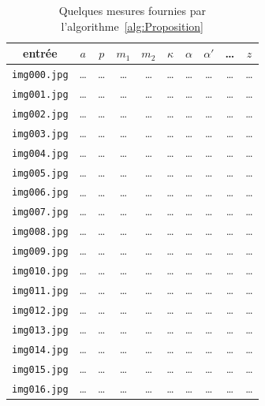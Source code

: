 \documentclass[11pt, french, screen, research-development]{report-rd-info}
\begin{document}
\begin{table}
   \centering
   \begin{tabular}{|c||c|c|c|c|c|c|c|c|c|}
      \hline
      entrée & $a$ & $p$ & $m_1$ & $m_2$ & $\kappa$ & $\alpha$ & $\alpha'$ & \ldots & $z$ \\
      \hline
      \hline
      \texttt{img000.jpg} & \ldots & \ldots & \ldots & \ldots & \ldots & \ldots & \ldots & \ldots & \ldots\\
      \texttt{img001.jpg} & \ldots & \ldots & \ldots & \ldots & \ldots & \ldots & \ldots & \ldots & \ldots\\
      \texttt{img002.jpg} & \ldots & \ldots & \ldots & \ldots & \ldots & \ldots & \ldots & \ldots & \ldots\\
      \texttt{img003.jpg} & \ldots & \ldots & \ldots & \ldots & \ldots & \ldots & \ldots & \ldots & \ldots\\
      \texttt{img004.jpg} & \ldots & \ldots & \ldots & \ldots & \ldots & \ldots & \ldots & \ldots & \ldots\\
      \texttt{img005.jpg} & \ldots & \ldots & \ldots & \ldots & \ldots & \ldots & \ldots & \ldots & \ldots\\
      \texttt{img006.jpg} & \ldots & \ldots & \ldots & \ldots & \ldots & \ldots & \ldots & \ldots & \ldots\\
      \texttt{img007.jpg} & \ldots & \ldots & \ldots & \ldots & \ldots & \ldots & \ldots & \ldots & \ldots\\
      \texttt{img008.jpg} & \ldots & \ldots & \ldots & \ldots & \ldots & \ldots & \ldots & \ldots & \ldots\\
      \texttt{img009.jpg} & \ldots & \ldots & \ldots & \ldots & \ldots & \ldots & \ldots & \ldots & \ldots\\
      \texttt{img010.jpg} & \ldots & \ldots & \ldots & \ldots & \ldots & \ldots & \ldots & \ldots & \ldots\\
      \texttt{img011.jpg} & \ldots & \ldots & \ldots & \ldots & \ldots & \ldots & \ldots & \ldots & \ldots\\
      \texttt{img012.jpg} & \ldots & \ldots & \ldots & \ldots & \ldots & \ldots & \ldots & \ldots & \ldots\\
      \texttt{img013.jpg} & \ldots & \ldots & \ldots & \ldots & \ldots & \ldots & \ldots & \ldots & \ldots\\
      \texttt{img014.jpg} & \ldots & \ldots & \ldots & \ldots & \ldots & \ldots & \ldots & \ldots & \ldots\\
      \texttt{img015.jpg} & \ldots & \ldots & \ldots & \ldots & \ldots & \ldots & \ldots & \ldots & \ldots\\
      \texttt{img016.jpg} & \ldots & \ldots & \ldots & \ldots & \ldots & \ldots & \ldots & \ldots & \ldots\\
      \hline
   \end{tabular}
   \caption{Quelques mesures fournies par l'algorithme~\ref{alg:Proposition}}
   \label{tab:MesuresAlgorithme}
\end{table}
\end{document}
